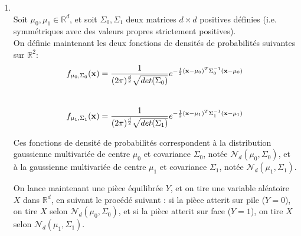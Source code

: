 \documentclass[11pt,french,english]{article}
\begin{document}
\begin{enumerate}
\item \textbf{} %
\\

{Soit $\mu_{0}, \mu_{1} \in \mathbb{R}^{d}$, et soit $\Sigma_{0}, \Sigma_{1}$ deux matrices $d \times d$ positives définies (i.e. symmétriques avec des valeurs propres strictement positives). \\
On définie maintenant les deux fonctions de densités de probabilités suivantes sur $\mathbb{R}^{2}$:} \\

$$f_{\mu_{0},\Sigma_{0}}(\mathbf{x})=\frac{1}{(2\pi)^{\frac{d}{2}}\sqrt{det(\Sigma_{0})}}e^{-\frac{1}{2}(\mathbf{x}-\mu_{0})^{T}\Sigma_{0}^{-1}(\mathbf{x}-\mu_{0})}$$ \\
$$f_{\mu_{1},\Sigma_{1}}(\mathbf{x})=\frac{1}{(2\pi)^{\frac{d}{2}}\sqrt{det(\Sigma_{1})}}e^{-\frac{1}{2}(\mathbf{x}-\mu_{1})^{T}\Sigma_{1}^{-1}(\mathbf{x}-\mu_{1})}$$

{Ces fonctions de densité de probabilités correspondent à la distribution gaussienne multivariée de centre $\mu_0$ et covariance $\Sigma_0$, notée $\mathcal{N}_{d}(\mu_{0},\Sigma_{0})$, et à la gaussienne multivariée de centre $\mu_{1}$ et covariance $\Sigma_{1}$, notée $\mathcal{N}_{d}(\mu_{1},\Sigma_{1})$.}

{On lance maintenant une pièce équilibrée $Y$, et on tire une variable aléatoire $X$ dans $\mathbb{R}^{d}$, en suivant le procédé suivant : si la pièce atterit sur pile ($Y=0$), on tire $X$ selon $\mathcal{N}_{d}(\mu_{0},\Sigma_{0})$, et si la pièce atterit sur face ($Y=1$), on tire $X$ selon $\mathcal{N}_{d}(\mu_{1},\Sigma_{1})$. }


\end{enumerate}
\end{document}

